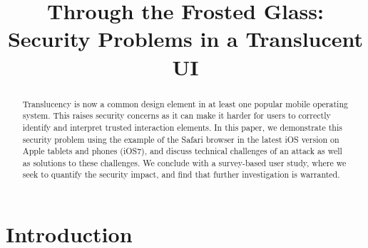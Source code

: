 \documentclass[twoside,letterpaper]{soups}
\begin{document}
\title{Through the Frosted Glass:\\Security Problems in a Translucent UI}%
\author{} %


\maketitle

\begin{abstract}
Translucency is now a common design element in at least one popular mobile operating system. This raises security concerns as it can make it harder for users to correctly identify and interpret trusted interaction elements. In this paper, we demonstrate this security problem using the example of the Safari browser in the latest iOS version on Apple tablets and phones (iOS7), and discuss technical challenges of an attack as well as solutions to these challenges. We conclude with a survey-based user study, where we seek to quantify the security impact, and find that further investigation is warranted.
\end{abstract}



\section{Introduction}

\end{document}
